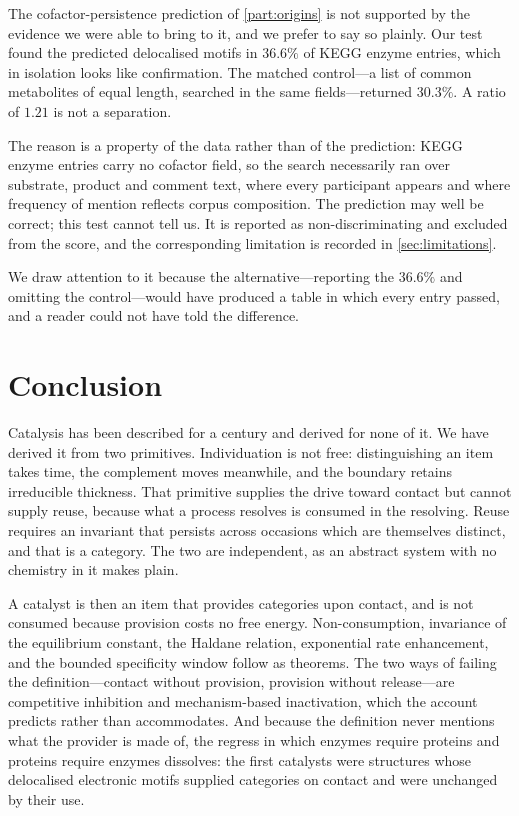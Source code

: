 \documentclass[11pt,twocolumn,a4paper]{article}
\theoremstyle{plain}
\theoremstyle{definition}
\theoremstyle{remark}
\begin{document}
The cofactor-persistence prediction of \cref{part:origins} is not supported by
the evidence we were able to bring to it, and we prefer to say so plainly. Our
test found the predicted delocalised motifs in $36.6\%$ of KEGG enzyme entries,
which in isolation looks like confirmation. The matched control---a list of
common metabolites of equal length, searched in the same fields---returned
$30.3\%$. A ratio of $1.21$ is not a separation.

The reason is a property of the data rather than of the prediction: KEGG
enzyme entries carry no cofactor field, so the search necessarily ran over
substrate, product and comment text, where every participant appears and
where frequency of mention reflects corpus composition. The prediction may
well be correct; this test cannot tell us. It is reported as
non-discriminating and excluded from the score, and the corresponding
limitation is recorded in \cref{sec:limitations}.

We draw attention to it because the alternative---reporting the $36.6\%$ and
omitting the control---would have produced a table in which every entry
passed, and a reader could not have told the difference.

\section{Conclusion}
\label{sec:conclusion}

Catalysis has been described for a century and derived for none of it. We have
derived it from two primitives. Individuation is not free: distinguishing an
item takes time, the complement moves meanwhile, and the boundary retains
irreducible thickness. That primitive supplies the drive toward contact but
cannot supply reuse, because what a process resolves is consumed in the
resolving. Reuse requires an invariant that persists across occasions which are
themselves distinct, and that is a category. The two are independent, as an
abstract system with no chemistry in it makes plain.

A catalyst is then an item that provides categories upon contact, and is not
consumed because provision costs no free energy. Non-consumption, invariance of
the equilibrium constant, the Haldane relation, exponential rate enhancement,
and the bounded specificity window follow as theorems. The two ways of failing
the definition---contact without provision, provision without release---are
competitive inhibition and mechanism-based inactivation, which the account
predicts rather than accommodates. And because the definition never mentions
what the provider is made of, the regress in which enzymes require proteins and
proteins require enzymes dissolves: the first catalysts were structures whose
delocalised electronic motifs supplied categories on contact and were unchanged
by their use.
\end{document}
